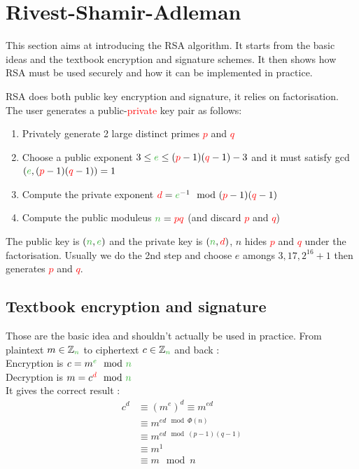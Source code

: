 \documentclass[11pt,a4paper]{report}
\begin{document}
\section{Rivest-Shamir-Adleman}
This section aims at introducing the RSA algorithm. It starts from the basic ideas and the textbook encryption and signature schemes. It then shows how RSA must be used securely and how it can be implemented in practice.

RSA does both public key encryption and signature, it relies on factorisation. The user generates a \textcolor{ao}{public}-\textcolor{red}{private} key pair as follows:
\begin{enumerate}
\item Privately generate 2 large distinct primes \textcolor{red}{$p$} and \textcolor{red}{$q$}
\item Choose a public exponent $3 \leq \textcolor{ao}{e} \leq (\textcolor{red}{p} - 1)(\textcolor{red}{q} - 1) - 3$ and it must satisfy gcd$(\textcolor{ao}{e},(\textcolor{red}{p}-1)(\textcolor{red}{q}-1)) = 1$
\item Compute the private exponent $\textcolor{red}{d} = \textcolor{ao}{e}^{-1} \mod (\textcolor{red}{p} - 1)(\textcolor{red}{q} - 1)$
\item Compute the public moduleus $ \textcolor{ao}{n} = \textcolor{red}{p}\textcolor{red}{q}$ (and discard \textcolor{red}{$p$} and \textcolor{red}{$q$})
\end{enumerate}
The public key is $(\textcolor{ao}{n},\textcolor{ao}{e})$ and the private key is $(\textcolor{ao}{n},\textcolor{red}{d})$, \textcolor{ao}{$n$} hides \textcolor{red}{$p$} and \textcolor{red}{$q$} under the factorisation. Usually we do the 2nd step and choose \textcolor{ao}{$e$} amongs ${3,17,2^{16} + 1}$ then generates \textcolor{red}{$p$} and \textcolor{red}{$q$}.

\subsection{Textbook encryption and signature}
Those are the basic idea and shouldn't actually be used in practice. From plaintext $m \in \mathbb{Z}_{\textcolor{ao}{n}}$ to ciphertext $c \in \mathbb{Z}_{\textcolor{ao}{n}}$ and back :\\
Encryption is $c = m^{\textcolor{ao}{e}} \mod \textcolor{ao}{n}$\\
Decryption is $m = c^{\textcolor{red}{d}} \mod \textcolor{ao}{n}$\\

It gives the correct result :
$$\begin{array}{rl}
c^d& \equiv (m^e )^d \equiv m^{ed}\\
& \equiv m^{ed \mod \Phi(n)} \\
& \equiv m^{ed \mod (p-1)(q-1)} \\
& \equiv m^1\\
& \equiv m \mod n
\end{array}$$
\end{document}
